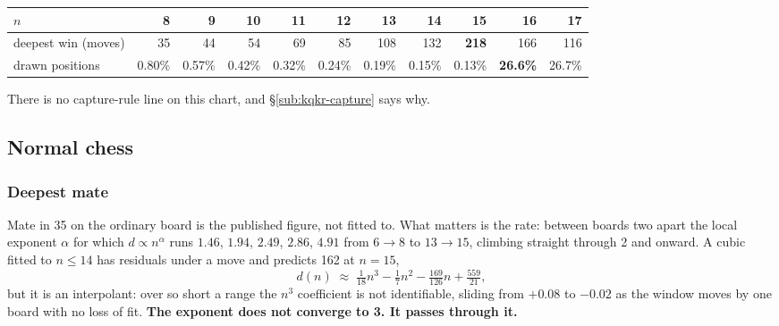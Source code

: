 \documentclass[10pt]{article}
\begin{document}
\vspace{-2mm}
\begin{center}\small
\begin{tabular}{@{}lrrrrrrrrrr@{}}
\toprule
$n$ & 8 & 9 & 10 & 11 & 12 & 13 & 14 & 15 & 16 & 17 \\
\midrule
deepest win (moves) & 35 & 44 & 54 & 69 & 85 & 108 & 132 & \textbf{218} & 166 & 116 \\
drawn positions & 0.80\% & 0.57\% & 0.42\% & 0.32\% & 0.24\% & 0.19\% & 0.15\% & 0.13\% &
  \textbf{26.6\%} & 26.7\% \\
\bottomrule
\end{tabular}
\end{center}

\noindent
There is no capture-rule line on this chart, and \S\ref{sub:kqkr-capture} says
why.

\subsection{Normal chess}\label{sub:kqkr-chess}

\subsubsection{Deepest mate}\label{sub:kqkr-law}

\noindent
Mate in 35 on the ordinary board is the published figure, not fitted to. What
matters is the rate: between boards two apart the local exponent $\alpha$ for
which $d\propto n^{\alpha}$ runs $1.46$, $1.94$, $2.49$, $2.86$, $4.91$ from
$6{\to}8$ to $13{\to}15$, climbing straight through 2 and onward. A cubic
fitted to $n\le14$ has residuals under a move and predicts 162 at $n=15$,
\[ d(n) \;\approx\; \tfrac{1}{18}n^{3} - \tfrac{1}{7}n^{2}
   - \tfrac{169}{126}n + \tfrac{559}{21}, \]
but it is an interpolant: over so short a range the $n^3$ coefficient is not
identifiable, sliding from $+0.08$ to $-0.02$ as the window moves by one board
with no loss of fit. \textbf{The exponent does not converge to 3. It passes
through it.}
\end{document}
